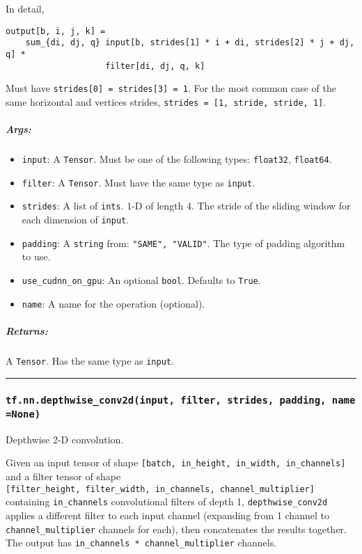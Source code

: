 In detail,

\begin{verbatim}
output[b, i, j, k] =
    sum_{di, dj, q} input[b, strides[1] * i + di, strides[2] * j + dj, q] *
                    filter[di, dj, q, k]
\end{verbatim}

Must have \texttt{strides{[}0{]}\ =\ strides{[}3{]}\ =\ 1}. For the most
common case of the same horizontal and vertices strides,
\texttt{strides\ =\ {[}1,\ stride,\ stride,\ 1{]}}.

\subparagraph{Args: }\label{args-7}

\begin{itemize}
\tightlist
\item
  \texttt{input}: A \texttt{Tensor}. Must be one of the following types:
  \texttt{float32}, \texttt{float64}.
\item
  \texttt{filter}: A \texttt{Tensor}. Must have the same type as
  \texttt{input}.
\item
  \texttt{strides}: A list of \texttt{ints}. 1-D of length 4. The stride
  of the sliding window for each dimension of \texttt{input}.
\item
  \texttt{padding}: A \texttt{string} from: \texttt{"SAME",\ "VALID"}.
  The type of padding algorithm to use.
\item
  \texttt{use\_cudnn\_on\_gpu}: An optional \texttt{bool}. Defaults to
  \texttt{True}.
\item
  \texttt{name}: A name for the operation (optional).
\end{itemize}

\subparagraph{Returns: }\label{returns-7}

A \texttt{Tensor}. Has the same type as \texttt{input}.

\begin{center}\rule{0.5\linewidth}{\linethickness}\end{center}

\subsubsection{\texorpdfstring{\texttt{tf.nn.depthwise\_conv2d(input,\ filter,\ strides,\ padding,\ name=None)}
}{tf.nn.depthwise\_conv2d(input, filter, strides, padding, name=None) }}\label{tf.nn.depthwiseux5fconv2dinput-filter-strides-padding-namenone}

Depthwise 2-D convolution.

Given an input tensor of shape
\texttt{{[}batch,\ in\_height,\ in\_width,\ in\_channels{]}} and a
filter tensor of shape
\texttt{{[}filter\_height,\ filter\_width,\ in\_channels,\ channel\_multiplier{]}}
containing \texttt{in\_channels} convolutional filters of depth 1,
\texttt{depthwise\_conv2d} applies a different filter to each input
channel (expanding from 1 channel to \texttt{channel\_multiplier}
channels for each), then concatenates the results together. The output
has \texttt{in\_channels\ *\ channel\_multiplier} channels.

